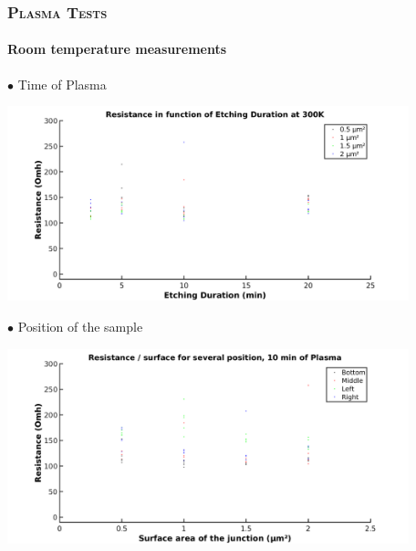 \documentclass{beamer}
\begin{document}
    \begin{frame}[allowframebreaks]
        \frametitle{\textsc{Plasma Tests}}
        \framesubtitle{Room temperature measurements}
        $\bullet$  Time of Plasma
        \vspace{0.5cm}
        
        \includegraphics[width=330pt]{R_Time.png}
        \vspace{1cm}
        
        $\bullet$  Position of the sample
        \vspace{0.5cm}
        
        \includegraphics[width=330pt]{R_Position.png}

    \end{frame}
    
\end{document}
